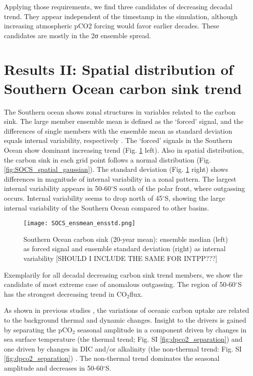 \documentclass[12pt]{article}
\begin{document}
Applying those requirements, we find three candidates of decreasing decadal trend. They appear independent of the timestamp in the simulation, although increasing atmospheric pCO2 forcing would favor earlier decades. These candidates are mostly in the 2σ ensemble spread. 


\section{Results II: Spatial distribution of Southern Ocean carbon sink trend}

The Southern ocean shows zonal structures in variables related to the carbon sink. 
The large member ensemble mean is defined as the ‘forced’ signal, and the differences of single members with the ensemble mean as standard deviation equals internal variability, respectively \cite{Deser2012}. The ‘forced’ signals in the Southern Ocean show dominant increasing trend (Fig. \ref{fig:SOCS_ensmean_ensstd} left). Also in spatial distribution, the carbon sink in each grid point follows a normal distribution (Fig. \ref{fig:SOCS_spatial_gaussian}). The standard deviation (Fig. \ref{fig:SOCS_ensmean_ensstd} right) shows differences in magnitude of internal variability in a zonal pattern. The largest internal variability appears in 50-60$^\circ$S south of the polar front, where outgassing occurs. Internal variability seems to drop north of 45$^\circ$S, showing the large internal variability of the Southern Ocean compared to other basins.

\begin{figure}
\texttt{[image: SOCS\_ensmean\_ensstd.png]} %
\label{fig:SOCS_ensmean_ensstd}
\caption{Southern Ocean carbon sink (20-year mean): ensemble median (left) as forced signal and ensemble standard deviation (right) as internal variability [SHOULD I INCLUDE THE SAME FOR INTPP???]}
\end{figure}

Exemplarily for all decadal decreasing carbon sink trend members, we show the candidate of most extreme case of anomalous outgassing. The region of 50-60$^\circ$S has the strongest decreasing trend in CO$_2$flux.

As shown in previous studies \cite{LeQuere2007}, the variations of oceanic carbon uptake are related to the background thermal and dynamic changes. Insight to the drivers is gained by separating the pCO$_2$ seasonal amplitude in a component driven by changes in sea surface temperature (the thermal trend; Fig. SI \ref{fig:dpco2_separation}) and one driven by changes in DIC and/or alkalinity (the non-thermal trend: Fig. SI \ref{fig:dpco2_separation}) \cite{Takahashi2002}. The non-thermal trend dominates the seasonal amplitude and decreases in 50-60$^\circ$S.
\end{document}
